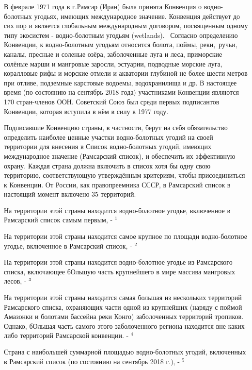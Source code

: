 
В феврале 1971 года в г.Рамсар (Иран) была принята Конвенция о водно-болотных угодьях, имеющих международное значение. Конвенция действует до сих пор и является глобальным международным договором, посвященным одному типу экосистем - водно-болотным угодьям (wetlands). 
Согласно определению Конвенции, к водно-болотным угодьям относится болота, поймы, реки, ручьи, каналы,
пресные и соленые озёра, заболоченные луга и леса, 
 приморские солёные марши и мангровые заросли, эстуарии, подводные морские луга, коралловые рифы и морские отмели и акватории глубиной не более шести метров при отливе, 
подземные карстовые водоемы, водохранилища и др. В настоящее время (по состоянию на сентябрь 2018 года) участниками Конвенции являются 170 стран-членов ООН. Советский Союз был среди первых подписантов Конвенции, которая вступила в нём в силу в 1977 году.

Подписавшие Конвенцию страны, в частности, берут на себя обязательство определить наиболее ценные участки водно-болотных угодий на своей территории для внесения в Список водно-болотных угодий, имеющих международное значение (Рамсарский список), и обеспечить их эффективную охрану. Каждая страна должна включить в список хотя бы одну свою территорию, соответствующую утверждённым критериям, чтобы присоединиться к Конвенции. От России, как правопреемника СССР, в Рамсарский список в настоящий момент 
включено 35 территорий.

На территории этой страны находится водно-болотное угодье, включенное в Рамсарский список самым первым, - \makebox[2cm]{\hrulefill}$^1$

На территории этой страны находится самое крупное по площади водно-болотное угодье, включенное в Рамсарский список, - \makebox[2cm]{\hrulefill}$^2$

На территории этой страны находится водно-болотное угодье из Рамсарского списка, включающее бОльшую часть крупнейшего в мире массива мангровых лесов, - \makebox[2cm]{\hrulefill}$^3$

На территории этой страны находится самая большая из нескольких территорий Рамсарского списка, охраняющих части одной из крупнейших (наряду с поймой Амазонки и болотами бассейна реки Конго) заболоченных территорий тропиков. Однако, бОльшая часть самого этого заболоченного региона находится вне каких-либо территорий Рамсарской конвенции. - \makebox[2cm]{\hrulefill}$^4$

Страна с наибольшей суммарной площадью водно-болотных угодий, включенных в Рамсарский список (по состоянию на сентябрь 2018 г.), - \makebox[2cm]{\hrulefill}$^5$

